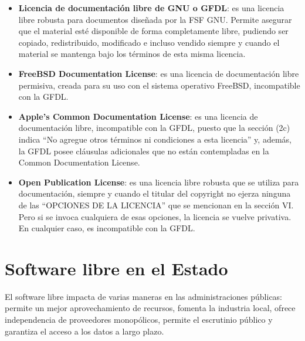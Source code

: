\begin{itemize}

\item {\bf Licencia de documentación libre de GNU o GFDL}: es una licencia libre robusta para documentos diseñada por la FSF GNU. Permite asegurar que el material esté disponible de forma completamente libre, pudiendo ser copiado, redistribuido, modificado e incluso vendido siempre y cuando el material se mantenga bajo los términos de esta misma licencia. 

\item {\bf FreeBSD Documentation License}: es una licencia de documentación libre permisiva, creada para su uso con el sistema operativo FreeBSD, incompatible con la GFDL.

\item {\bf Apple's Common Documentation License}: es una licencia de documentación libre, incompatible con la GFDL, puesto que la sección (2c) indica ``No agregue otros términos ni condiciones a esta licencia'' y, además, la GFDL posee cláusulas adicionales que no están contempladas en la Common Documentation License.

\item {\bf Open Publication License}: es una licencia libre robusta que se utiliza para documentación, siempre y cuando el titular del copyright no ejerza ninguna de las ``OPCIONES DE LA LICENCIA'' que se mencionan en la sección VI. Pero si se invoca cualquiera de esas opciones, la licencia se vuelve privativa. En cualquier caso, es incompatible con la GFDL.
    
\end{itemize}


\section{Software libre en el Estado}

El software libre impacta de varias maneras en las administraciones públicas: permite un mejor aprovechamiento de recursos, fomenta la industria local, ofrece independencia de proveedores monopólicos, permite el escrutinio público y garantiza el acceso a los datos a largo plazo.

